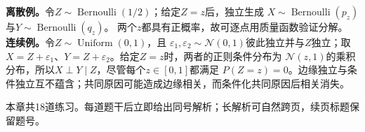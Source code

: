 \textbf{离散例。}令$Z\sim\operatorname{Bernoulli}(1/2)$；给定$Z=z$后，独立生成
$X\sim\operatorname{Bernoulli}(p_z)$与$Y\sim\operatorname{Bernoulli}(q_z)$。
两个$z$都具有正概率，故可逐点用质量函数验证分解。
\textbf{连续例。}令$Z\sim\operatorname{Uniform}(0,1)$，且
$\varepsilon_1,\varepsilon_2\sim\mathcal N(0,1)$彼此独立并与$Z$独立；取
$X=Z+\varepsilon_1$、$Y=Z+\varepsilon_2$。给定$Z=z$时，两者的正则条件分布为
$\mathcal N(z,1)$的乘积分布，所以$X\perp Y\mid Z$，尽管每个$z\in[0,1]$都满足
$P(Z=z)=0$。边缘独立与条件独立互不蕴含；共同原因可能造成边缘相关，而条件化共同原因后相关消失。

\label{struct:V1-C04-CH16}
\begin{chapterexercisebox}
\label{struct:V1-C04-CH34}
\label{struct:V1-C04-CH35}
本章共18道练习。每道题干后立即给出同号解析；长解析可自然跨页，续页标题保留题号。
\end{chapterexercisebox}

